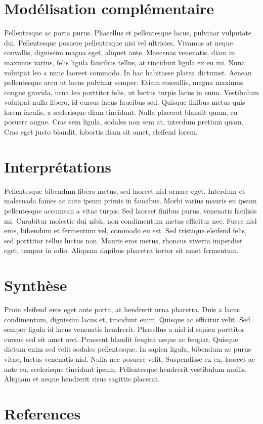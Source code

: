 \hypertarget{moduxe9lisation-compluxe9mentaire}{%
\section{Modélisation
complémentaire}\label{moduxe9lisation-compluxe9mentaire}}

Pellentesque ac porta purus. Phasellus et pellentesque lacus, pulvinar
vulputate dui. Pellentesque posuere pellentesque nisi vel ultricies.
Vivamus at neque convallis, dignissim magna eget, aliquet ante. Maecenas
venenatis, diam in maximus varius, felis ligula faucibus tellus, at
tincidunt ligula ex eu mi. Nunc volutpat leo a nunc laoreet commodo. In
hac habitasse platea dictumst. Aenean pellentesque arcu ut lacus
pulvinar semper. Etiam convallis, magna maximus congue gravida, urna leo
porttitor felis, ut luctus turpis lacus in enim. Vestibulum volutpat
nulla libero, id cursus lacus faucibus sed. Quisque finibus metus quis
lorem iaculis, a scelerisque diam tincidunt. Nulla placerat blandit
quam, eu posuere augue. Cras sem ligula, sodales non sem at, interdum
pretium quam. Cras eget justo blandit, lobortis diam sit amet, eleifend
lorem.

\hypertarget{interpruxe9tations}{%
\section{Interprétations}\label{interpruxe9tations}}

Pellentesque bibendum libero metus, sed laoreet nisl ornare eget.
Interdum et malesuada fames ac ante ipsum primis in faucibus. Morbi
varius mauris eu ipsum pellentesque accumsan a vitae turpis. Sed laoreet
finibus purus, venenatis facilisis mi. Curabitur molestie dui nibh, non
condimentum metus efficitur nec. Fusce nisl eros, bibendum et fermentum
vel, commodo eu est. Sed tristique eleifend felis, sed porttitor tellus
luctus non. Mauris eros metus, rhoncus viverra imperdiet eget, tempor in
odio. Aliquam dapibus pharetra tortor sit amet fermentum.

\hypertarget{synthuxe8se}{%
\section{Synthèse}\label{synthuxe8se}}

Proin eleifend eros eget ante porta, at hendrerit urna pharetra. Duis a
lacus condimentum, dignissim lacus et, tincidunt enim. Quisque ac
efficitur velit. Sed semper ligula id lacus venenatis hendrerit.
Phasellus a nisl id sapien porttitor cursus sed sit amet orci. Praesent
blandit feugiat neque ac feugiat. Quisque dictum enim sed velit sodales
pellentesque. In sapien ligula, bibendum ac purus vitae, luctus
venenatis nisl. Nulla nec posuere velit. Suspendisse ex ex, laoreet ac
ante eu, scelerisque tincidunt ipsum. Pellentesque hendrerit vestibulum
mollis. Aliquam et neque hendrerit risus sagittis placerat.

\hypertarget{references}{%
\section{References}\label{references}}
